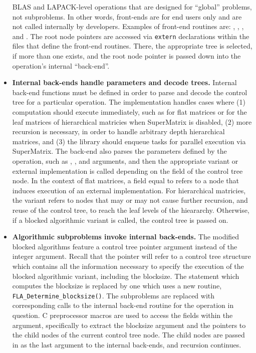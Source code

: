 \begin{itemize}
BLAS and LAPACK-level operations that are designed for ``global'' problems,
not subproblems.
In other words, front-ends are for end users only and are not called
internally by \libflame developers.
Examples of front-end routines are: \flasyrkns, \flatrsmns, \flacholns, and
\flaspdinvns.
The root node pointers are accessed via {\tt extern} declarations within the
files that define the front-end routines.
There, the appropriate tree is selected, if more than one exists, and the
root node pointer is passed down into the operation's internal ``back-end''.
\item
{\bf Internal back-ends handle parameters and decode trees.}
Internal back-end functions must be defined in order to parse and decode
the control tree for a particular operation.
The implementation handles cases where (1) computation should execute
immediately, such as for flat matrices or for the leaf matrices of
hierarchical matricies when SuperMatrix is disabled, (2) more recursion
is necessary, in order to handle arbitrary depth hierarchical matrices,
and (3) the library should enqueue tasks for parallel execution via
SuperMatrix.
The back-end also parses the parameters defined by the operation, such
as \sidens, \uplons, and \trans arguments, and then the appropriate
variant or external implementation is called depending on the \variant
field of the control tree node.
In the context of flat matrices, a \variant field equal to \flasubproblem
refers to a node that induces execution of an external implementation.
For hierarchical matricies, the \flasubproblem variant refers to nodes that
may or may not cause further recursion, and reuse of the control tree, to
reach the leaf levels of the hieararchy.
Otherwise, if a blocked algorithmic variant is called, the control tree is
passed on.
\item
{\bf Algorithmic subproblems invoke internal back-ends.}
The modified blocked algorithms feature a \cntl control tree pointer
argument instead of the integer \nbalg argument.
Recall that the pointer will refer to a control tree structure which
contains all the information necessary to specify the execution of the
blocked algorithmic variant, including the blocksize.
The statement which computes the blocksize is replaced by one which
uses a new routine, {\tt FLA\_Determine\_blocksize()}.
The subproblems are replaced with corresponding calls to the internal
back-end routine for the operation in question.
C preprocessor macros are used to access the fields within the \cntl
argument, specifically to extract the blocksize argument and the 
pointers to the child nodes of the current control tree node.
The child nodes are passed in as the last argument to the internal
back-ends, and recursion continues.
\end{itemize}



